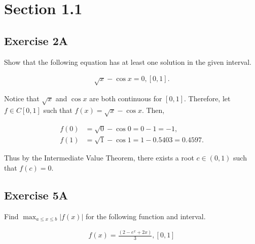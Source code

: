 \documentclass[a4paper, 10pt]{article}
\newenvironment{answer}[1][Answer]{\begin{trivlist}
\item[\hskip\labelsep{\textit{#1.}}]}{\end{trivlist}}
\begin{document}
\raggedcolumns{}
\tableofcontents

\section{Section 1.1}


\subsection{Exercise 2A}

Show that the following equation has at least one solution in the given interval.

\begin{align*}
	\sqrt{x} - \cos{x} = 0, \left[ 0,1 \right].
\end{align*}

\begin{answer}
	Notice that $\sqrt{x}$ and $\cos{x}$ are both continuous for $[0,1]$. Therefore, let $f\in C[0,1]$ such that $f(x) = \sqrt{x} - \cos{x}$. Then,

	\begin{align*}
		f(0) &= \sqrt{0} - \cos{0} = 0 - 1 = -1,\\
		f(1) &= \sqrt{1} - \cos{1} = 1 - 0.5403 = 0.4597.  
	\end{align*}
\end{answer}

Thus by the Intermediate Value Theorem, there exists a root $c\in (0,1)$ such that $f(c)=0$.

\subsection{Exercise 5A}

Find $\max_{a\leq x \leq b} | f(x) |$ for the following function and interval.

\begin{align*}
	f(x) = \frac{(2 - e^x + 2x)}{3}, [0,1]
\end{align*}
\end{document}
